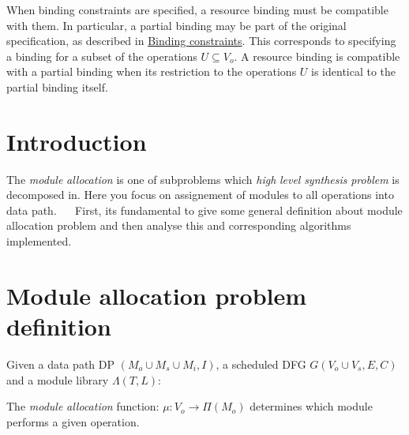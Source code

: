 When binding constraints are specified, a resource binding must be compatible with them. In particular, a partial binding may be part of the original specification, as described in \hyperlink{src_HLS_binding_constraints_page}{Binding constraints}. This corresponds to specifying a binding for a subset of the operations $U\subseteq V_o$. A resource binding is compatible with a partial binding when its restriction to the operations $U$ is identical to the partial binding itself.\hypertarget{PandA_DOC_intro}{}\section{Introduction}\label{PandA_DOC_intro}
The {\itshape module} {\itshape allocation} is one of subproblems which {\itshape high} {\itshape level} {\itshape synthesis} {\itshape problem} is decomposed in. Here you focus on assignement of modules to all operations into data path.~\newline
~\newline
 First, it\textquotesingle{}s fundamental to give some general definition about module allocation problem and then analyse this and corresponding algorithms implemented.~\newline
~\newline
 \hypertarget{src_HLS_module_binding_page_def_module}{}\section{Module allocation problem definition}\label{src_HLS_module_binding_page_def_module}
Given a data path DP $(M_o\cup M_s\cup M_i,I)$, a scheduled D\+FG $G(V_o\cup V_s,E,C)$ and a module library $\Lambda (T,L)$\+: ~\newline

\begin{DoxyItemize}
\item The {\itshape module} {\itshape allocation} function\+: $ \mu :V_o \rightarrow \Pi (M_o)$ determines which module performs a given operation.
\end{DoxyItemize}

